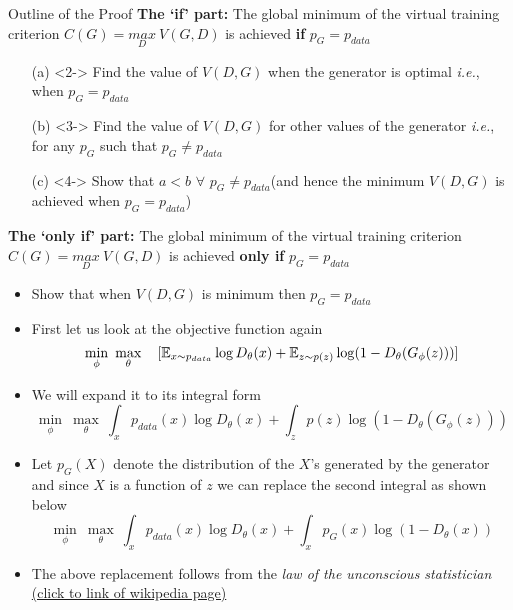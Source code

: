 \begin{frame}
	\begin{block}{Outline of the Proof}
	\textbf{The `if' part:} The global minimum of the virtual training criterion $C(G)=\underset{D}{max} ~V(G,D)$ is achieved \textbf{if} $p_G=p_{data}$
		\begin{enumerate}
			\item[(a)]<2-> \alert<6>{Find the value of $V(D,G)$ when the generator is optimal \textit{i.e.}, when $p_G=p_{data}$}
			\item[(b)]<3-> Find the value of $V(D,G)$ for other values of the generator \textit{i.e.}, for any $p_G$ such that $p_G \neq p_{data}$
			\item[(c)]<4-> Show that $a < b$ $\forall$ $p_G \neq p_{data}$(and hence the minimum $V(D,G)$ is achieved when $p_G=p_{data}$)
		\end{enumerate}
	\vspace{5mm}
	\textbf{The `only if' part:} The global minimum of the virtual training criterion $C(G)=\underset{D}{max} ~V(G,D)$ is achieved \textbf{only if} $p_G=p_{data}$
	\begin{itemize}
		\item<5-> Show that when $V(D,G)$ is minimum then $p_G=p_{data}$
	\end{itemize}
	\end{block}
\end{frame}

\begin{frame}
	\begin{itemize}[<+->]
		\item First let us look at the objective function again 
				$$ \min\limits_{\phi}~ \max\limits_{\theta} \hspace*{4mm} [\mathbb{E}_{x \sim p_{data}} \log D_{\theta}(x) + \mathbb{E}_{z \sim p(z)} \log(1- D_{\theta}(G_{\phi}(z)) ) ] $$

		\item We will expand it to its integral form
			$$\min\limits_{\phi}~ \max\limits_{\theta} ~  \int_x p_{data}(x) \log D_{\theta}(x) + \int_z p(z) \log(1 - D_{\theta}(G_{\phi}(z)))$$
		\item Let $p_G(X)$ denote the distribution of the $X$'s generated by the generator and since $X$ is a function of $z$ we can replace the second integral as shown below
			$$\min\limits_{\phi}~ \max\limits_{\theta} ~  \int_x p_{data}(x) \log D_{\theta}(x) + \int_x p_G(x) \log(1 - D_{\theta}(x))$$
		\item The above replacement follows from the \textit{law of the unconscious statistician} \href{https://en.wikipedia.org/wiki/Law_of_the_unconscious_statistician}{(click to link of wikipedia page)}
	\end{itemize}
\end{frame}

